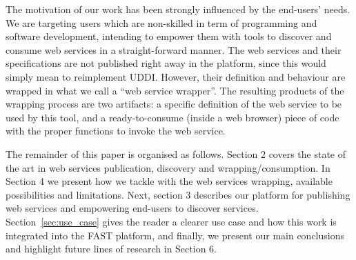The motivation of our work has been strongly influenced by the end-users' needs. We are targeting users which are non-skilled in term of programming and software development, intending to empower them with tools to discover and consume web services in a straight-forward manner.
The web services and their specifications are not published right away in the platform, since this would simply mean to reimplement UDDI.
However, their definition and behaviour are wrapped in what we call a ``web service wrapper''. The resulting products of the wrapping process are two artifacts: a specific definition of the web service to be used by this tool, and a ready-to-consume (inside a web browser) piece of code with the proper functions to invoke the web service.

The remainder of this paper is organised as follows. Section 2 covers the state of the art in web services publication, discovery and wrapping/consumption. In Section 4 we present how we tackle with the web services wrapping, available possibilities and limitations. Next, section 3 describes our platform for publishing web services and empowering end-users to discover services. Section~\ref{sec:use_case} gives the reader a clearer use case and how this work is integrated into the FAST platform, and finally, we present our main conclusions and highlight future lines of research in Section 6.

